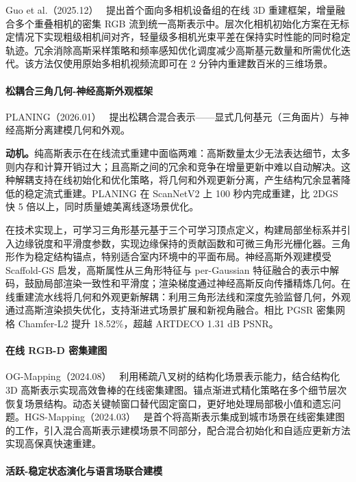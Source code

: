 Guo et al.（2025.12）~\cite{2512_08498} 提出首个面向多相机设备组的在线 3D 重建框架，增量融合多个重叠相机的密集 RGB 流到统一高斯表示中。层次化相机初始化方案在无标定情况下实现粗级相机间对齐，轻量级多相机光束平差在保持实时性能的同时稳定轨迹。冗余消除高斯采样策略和频率感知优化调度减少高斯基元数量和所需优化迭代。该方法仅使用原始多相机视频流即可在 2 分钟内重建数百米的三维场景。

\paragraph{松耦合三角几何-神经高斯外观框架}

PLANING（2026.01）~\cite{2601_22046} 提出松耦合混合表示——显式几何基元（三角面片）与神经高斯分离建模几何和外观。

\textbf{动机。}纯高斯表示在在线流式重建中面临两难：高斯数量太少无法表达细节，太多则内存和计算开销过大；且高斯之间的冗余和竞争在增量更新中难以自动解决。这种解耦支持在线初始化和优化策略，将几何和外观更新分离，产生结构冗余显著降低的稳定流式重建。PLANING 在 ScanNetV2 上 100 秒内完成重建，比 2DGS 快 5 倍以上，同时质量媲美离线逐场景优化。

在技术实现上，可学习三角形基元基于三个可学习顶点定义，构建局部坐标系并引入边缘锐度和平滑度参数，实现边缘保持的贡献函数和可微三角形光栅化器。三角形作为稳定结构锚点，特别适合室内环境中的平面布局。神经高斯外观建模受 Scaffold-GS 启发，高斯属性从三角形特征与 per-Gaussian 特征融合的表示中解码，鼓励局部渲染一致性和平滑度；渲染梯度通过神经高斯反向传播精炼几何。在线重建流水线将几何和外观更新解耦：利用三角形法线和深度先验监督几何，外观通过高斯渲染损失优化，支持渐进式场景扩展和新视角融合。相比 PGSR 密集网格 Chamfer-L2 提升 18.52\%，超越 ARTDECO 1.31 dB PSNR。

\paragraph{在线 RGB-D 密集建图}

OG-Mapping（2024.08）~\cite{2408_17223} 利用稀疏八叉树的结构化场景表示能力，结合结构化 3D 高斯表示实现高效鲁棒的在线密集建图。锚点渐进式精化策略在多个细节层次恢复场景结构。动态关键帧窗口替代固定窗口，更好地处理局部极小值和遗忘问题。HGS-Mapping（2024.03）~\cite{2403_20159} 是首个将高斯表示集成到城市场景在线密集建图的工作，引入混合高斯表示建模场景不同部分，配合混合初始化和自适应更新方法实现高保真快速重建。

\paragraph{活跃-稳定状态演化与语言场联合建模}

